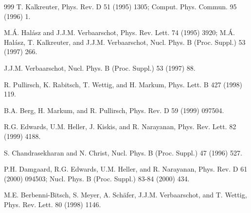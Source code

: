 \begin{thebibliography}{999}
      T. Kalkreuter, 
                      Phys. Rev. D 51 (1995) 1305;           %
                      Comput. Phys. Commun. 95 (1996) 1.     %

     M.\'A. Hal\'asz and J.J.M. Verbaarschot,
                      Phys. Rev. Lett. 74 (1995) 3920;       %
                      M.\'A. Hal\'asz, T. Kalkreuter, and
                      J.J.M. Verbaarschot,
                      Nucl. Phys. B (Proc. Suppl.) 53 (1997) 266.  %

                      J.J.M. Verbaarschot,
                      Nucl. Phys. B (Proc. Suppl.) 53 (1997) 88.   %

                      R. Pullirsch, K. Rabitsch, T. Wettig, and H. Markum,
                      Phys. Lett. B 427 (1998) 119.                %

                      B.A. Berg, H. Markum, and R. Pullirsch, 
                      Phys. Rev. D 59 (1999) 097504.               %

                      R.G. Edwards, U.M. Heller, J. Kiskis, and R. Narayanan, 
                      Phys. Rev. Lett. 82 (1999) 4188.             %

      S. Chandrasekharan and N. Christ, 
                      Nucl. Phys. B (Proc. Suppl.) 47 (1996) 527.   %

                      P.H. Damgaard, R.G. Edwards, U.M. Heller, and
                      R. Narayanan, 
                      Phys. Rev. D 61 (2000) 094503;
                      Nucl. Phys. B (Proc. Suppl.) 83-84 (2000) 434.

     M.E. Berbenni-Bitsch, S. Meyer, A. Sch\"afer,
                      J.J.M. Verbaarschot, and T. Wettig,  
                      Phys. Rev. Lett. 80 (1998) 1146.         %


\end{thebibliography}

